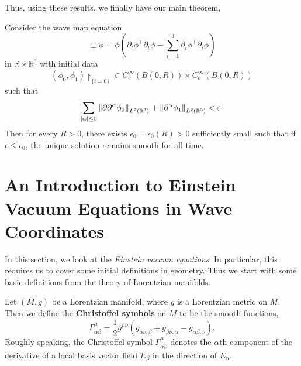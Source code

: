 \documentclass{article}
\begin{document}
Thus, using these results, we finally have our main theorem, 
\begin{theorem}
	Consider the wave map equation 
	\begin{equation*}
		\Box\phi = \phi\left(\partial_{t}\phi^{\top}\partial_{t}\phi - \sum_{i = 1}^{3}\partial_{i}\phi^{\top}\partial_{i}\phi\right)
	\end{equation*} 
	in $\mathbb{R} \times \mathbb{R}^{3}$ with initial data  
	\begin{equation*}
		(\phi_{0}, \phi_{1})\upharpoonright_{\{t  = 0\}} \in C_{c}^{\infty}(B(0,R)) \times C_{c}^{\infty}(B(0,R)) 
	\end{equation*} 
	such that 
	\begin{equation*}
		\sum_{|\alpha|\leq 5}\left\Vert \partial\partial^{\alpha}\phi_{0} \right\Vert_{L^{2}(\mathbb{R}^{3})} + \left\Vert \partial^{\alpha}\phi_{1} \right\Vert_{L^{2}(\mathbb{R}^{3})} < \varepsilon. 
	\end{equation*} 
	Then for every $R > 0$, there exists $\epsilon_{0} = \epsilon_{0}(R) > 0$ sufficiently small such that if $\epsilon \leq \epsilon_{0}$, the unique solution remains smooth for all time. 
\end{theorem}  

\newpage 
\section{An Introduction to Einstein Vacuum Equations in Wave Coordinates} 
In this section, we look at the \textit{Einstein vaccum equations}. In particular, this requires us to cover some initial definitions in geometry. Thus we start with some basic definitions from the theory of Lorentzian manifolds. 

\begin{definition}
	Let $(M, g)$ be a Lorentzian manifold, where $g$ is a Lorentzian metric on $M$. Then we define the \textbf{Christoffel symbols} on $M$ to be the smooth functions, 
	\begin{equation*}
		\Gamma^{\mu}_{\alpha\beta} = \frac{1}{2}g^{\mu\nu}(g_{\alpha\nu,\beta} + g_{\beta\nu,\alpha} - g_{\alpha\beta,\nu}). 
	\end{equation*}
	Roughly speaking, the Christoffel symbol $\Gamma^{\mu}_{\alpha\beta}$ denotes the $\alpha$th component of the derivative of a local basis vector field $E_{\beta}$ in the direction of $E_{\alpha}$. 
\end{definition} 
\end{document}
